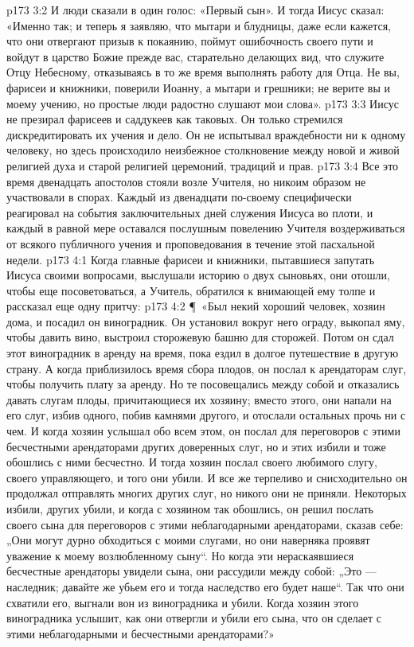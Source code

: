 \vs p173 3:2 И люди сказали в один голос: «Первый сын». И тогда Иисус сказал: «Именно так; и теперь я заявляю, что мытари и блудницы, даже если кажется, что они отвергают призыв к покаянию, поймут ошибочность своего пути и войдут в царство Божие прежде вас, старательно делающих вид, что служите Отцу Небесному, отказываясь в то же время выполнять работу для Отца. Не вы, фарисеи и книжники, поверили Иоанну, а мытари и грешники; не верите вы и моему учению, но простые люди радостно слушают мои слова».
\vs p173 3:3 Иисус не презирал фарисеев и саддукеев как таковых. Он только стремился дискредитировать их учения и дело. Он не испытывал враждебности ни к одному человеку, но здесь происходило неизбежное столкновение между новой и живой религией духа и старой религией церемоний, традиций и прав.
\vs p173 3:4 Все это время двенадцать апостолов стояли возле Учителя, но никоим образом не участвовали в спорах. Каждый из двенадцати по\hyp{}своему специфически реагировал на события заключительных дней служения Иисуса во плоти, и каждый в равной мере оставался послушным повелению Учителя воздерживаться от всякого публичного учения и проповедования в течение этой пасхальной недели.
\vs p173 4:1 Когда главные фарисеи и книжники, пытавшиеся запутать Иисуса своими вопросами, выслушали историю о двух сыновьях, они отошли, чтобы еще посоветоваться, а Учитель, обратился к внимающей ему толпе и рассказал еще одну притчу:
\vs p173 4:2 \P\ «Был некий хороший человек, хозяин дома, и посадил он виноградник. Он установил вокруг него ограду, выкопал яму, чтобы давить вино, выстроил сторожевую башню для сторожей. Потом он сдал этот виноградник в аренду на время, пока ездил в долгое путешествие в другую страну. А когда приблизилось время сбора плодов, он послал к арендаторам слуг, чтобы получить плату за аренду. Но те посовещались между собой и отказались давать слугам плоды, причитающиеся их хозяину; вместо этого, они напали на его слуг, избив одного, побив камнями другого, и отослали остальных прочь ни с чем. И когда хозяин услышал обо всем этом, он послал для переговоров с этими бесчестными арендаторами других доверенных слуг, но и этих избили и тоже обошлись с ними бесчестно. И тогда хозяин послал своего любимого слугу, своего управляющего, и того они убили. И все же терпеливо и снисходительно он продолжал отправлять многих других слуг, но никого они не приняли. Некоторых избили, других убили, и когда с хозяином так обошлись, он решил послать своего сына для переговоров с этими неблагодарными арендаторами, сказав себе: „Они могут дурно обходиться с моими слугами, но они наверняка проявят уважение к моему возлюбленному сыну“. Но когда эти нераскаявшиеся бесчестные арендаторы увидели сына, они рассудили между собой: „Это --- наследник; давайте же убьем его и тогда наследство его будет наше“. Так что они схватили его, выгнали вон из виноградника и убили. Когда хозяин этого виноградника услышит, как они отвергли и убили его сына, что он сделает с этими неблагодарными и бесчестными арендаторами?»
